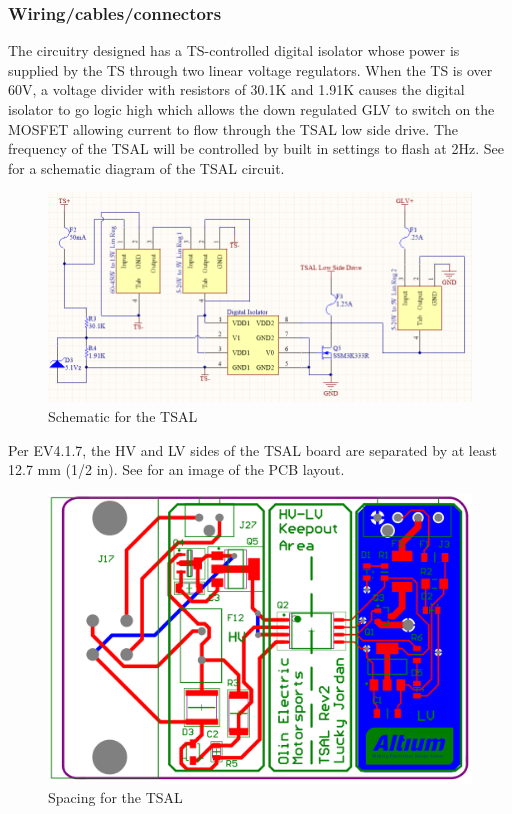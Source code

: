 \documentclass{article}
\begin{document}
\subsubsection{Wiring/cables/connectors}
The circuitry designed has a TS-controlled digital isolator whose power is supplied by the TS through two linear voltage regulators. When the TS is over 60V, a voltage divider with resistors of 30.1K and 1.91K causes the digital isolator to go logic high which allows the down regulated GLV to switch on the MOSFET allowing current to flow through the TSAL low side drive. The frequency of the TSAL will be controlled by built in settings to flash at 2Hz. See  for a schematic diagram of the TSAL circuit.

\begin{figure}[H]
\centering
\includegraphics[scale=.7]{TSAL.png}
\caption{Schematic for the TSAL}
\label{fig:TSALcircuit}
\end{figure}

Per EV4.1.7, the HV and LV sides of the TSAL board are separated by at least 12.7 mm (1/2 in). See  for an image of the PCB layout.

\begin{figure}[H]
\centering
\includegraphics[scale=.7]{TSALspacing.png}
\caption{Spacing for the TSAL}
\label{fig:TSALspacing}
\end{figure}
\end{document}
